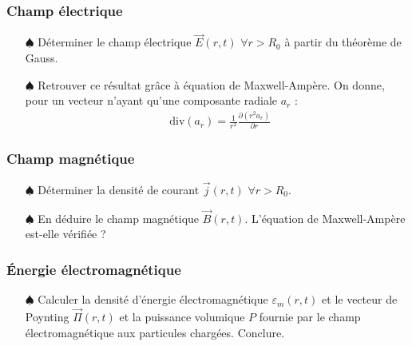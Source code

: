 \documentclass{report}
\newcommand*\diver{\mathop{}\!\mathrm{div}}
\begin{document}
\subsubsection*{Champ électrique}

\begin{itemize}

	\item[$\spadesuit$] Déterminer le champ électrique $\vec{E}(r,t)$ $\forall r>R_0$ à partir du théorème de Gauss.
	
	\item[$\spadesuit$] Retrouver ce résultat grâce à équation de Maxwell-Ampère. On donne, pour un vecteur n'ayant qu'une composante radiale $a_r$ : 
	\begin{align*}
		\diver(a_r)=\frac{1}{r^2}\frac{\partial (r^2a_r)}{\partial r}
	\end{align*}
	
\end{itemize}

\subsubsection*{Champ magnétique}

\begin{itemize}

	\item[$\spadesuit$] Déterminer la densité de courant $\vec{j}(r,t)$ $\forall r>R_0$.
	
	\item[$\spadesuit$] En déduire le champ magnétique $\vec{B}(r,t)$.  L'équation de Maxwell-Ampère est-elle vérifiée ?
	
	\end{itemize}

\subsubsection*{Énergie électromagnétique}

\begin{itemize}

	\item[$\spadesuit$] Calculer la densité d'énergie électromagnétique $\varepsilon_m(r,t)$ et le vecteur de Poynting $\vec{\Pi}(r,t)$ et la puissance volumique $P$ fournie par le champ électromagnétique aux particules chargées. Conclure.
	
\end{itemize}
\end{document}
